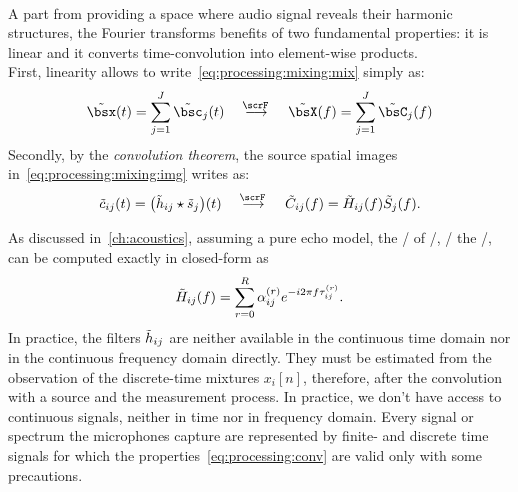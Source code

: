 \\A part from providing a space where audio signal reveals their harmonic structures, the Fourier transforms benefits of two fundamental properties:
it is linear and it converts time-convolution into element-wise products.
\\First, linearity allows to write~\cref{eq:processing:mixing:mix} simply as:
\begin{equation}\label{eq:processing:ft:mix}
    \tilde{\mics}( t) = \sum_{\idxSrc=1}^{\numSrcs} \tilde{\imgs}_\idxSrc( t)
    \mathspace\overset{\fourierTrans{}}{\kto}\mathspace
    \tilde{\MICS}( f) = \sum_{\idxSrc=1}^{\numSrcs} \tilde{\IMGS}_\idxSrc( f)
\end{equation}
Secondly, by the \textit{convolution theorem}, the source spatial images in~\cref{eq:processing:mixing:img} writes as:
\begin{equation}\label{eq:processing:conv}
    \tilde{\img}_{\idxMicSrc}( t) =  \kparen{\tilde{\rir}_{\idxMicSrc} \convCont \tilde{\src}_\idxSrc} ( t)
    \mathspace\overset{\fourierTrans{}}{\kto}\mathspace
    \tilde{\IMG}_{\idxMicSrc}( f) =  \tilde{H}_{\idxMicSrc}( f) \tilde{S}_\idxSrc( f)
    .
\end{equation}

\mynewline
As discussed in~\cref{ch:acoustics}, assuming a pure echo model, the \FT/ of \RIR/, \aka/ the \RTFdef/, can be computed exactly in closed-form as
\begin{equation}\label{eq:processing:rir:ft}
    \tilde{H}_{ij}( f) = \sum_{r=0}^{R} \alpha_{ij}^{(r)} {e}^{- {i} 2 \pi f \tau_{ij}^{(r)}}
    .
\end{equation}
In practice, the filters $\tilde{h}_{ij}$ are neither available in the continuous time domain nor in the continuous frequency domain directly.
They must be estimated from the observation of the discrete-time mixtures $x_i[n]$, therefore, after the convolution with a source and the measurement process.
In practice, we don't have access to continuous signals, neither in time nor in frequency domain.
Every signal or spectrum the microphones capture are represented by finite- and discrete time signals for which the properties~\eqref{eq:processing:conv} are valid only with some precautions.

